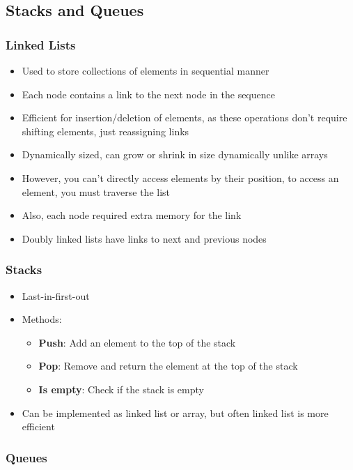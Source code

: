 \documentclass{article}
\begin{document}
\subsection{Stacks and Queues}

\subsubsection{Linked Lists}

\begin{itemize}
    \item Used to store collections of elements in sequential manner
    \item Each node contains a link to the next node in the sequence
    \item Efficient for insertion/deletion of elements, as these operations don't require shifting elements, just reassigning links
    \item Dynamically sized, can grow or shrink in size dynamically unlike arrays
    \item However, you can't directly access elements by their position, to access an element, you must traverse the list
    \item Also, each node required extra memory for the link
    \item Doubly linked lists have links to next and previous nodes
\end{itemize}

\subsubsection{Stacks}

\begin{itemize}
    \item Last-in-first-out
    \item Methods:
    \begin{itemize}
        \item \textbf{Push}: Add an element to the top of the stack
        \item \textbf{Pop}: Remove and return the element at the top of the stack
        \item \textbf{Is empty}: Check if the stack is empty
    \end{itemize}
    \item Can be implemented as linked list or array, but often linked list is more efficient
\end{itemize}

\subsubsection{Queues}
\end{document}
